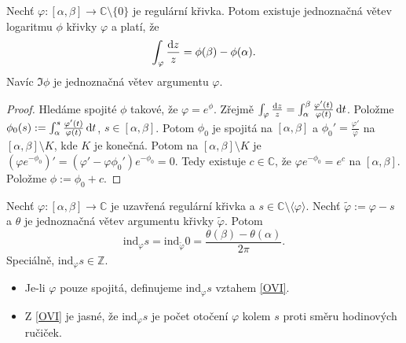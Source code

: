 \begin{theorem}
Nechť $\varphi: [\alpha, \beta] \rightarrow \mathbb{C} \setminus \{0\}$ je regulární křivka. Potom existuje jednoznačná větev logaritmu $\phi$ křivky $\varphi$ a platí, že
$$
\int_\varphi \frac{\mathop{}\!\mathrm{d} z}{z}=\phi(\beta) - \phi(\alpha) \text{.}
$$
Navíc $\Im \phi$ je jednoznačná větev argumentu $\varphi$.
\end{theorem}
\begin{proof}
Hledáme spojité $\phi$ takové, že $\varphi=e^\phi$. Zřejmě $\int_\varphi \frac{\mathop{}\!\mathrm{d} z}{z}=\int_\alpha^\beta \frac{\varphi'(t)}{\varphi(t)} \mathop{}\!\mathrm{d} t$. Položme $\phi_0(s):=\int_\alpha^s \frac{\varphi'(t)}{\varphi(t)} \mathop{}\!\mathrm{d} t$, $s \in [\alpha, \beta]$. Potom $\phi_0$ je spojitá na $[\alpha, \beta]$ a $\phi_0'=\frac{\varphi'}{\varphi}$ na $[\alpha, \beta] \setminus K$, kde $K$ je konečná. Potom na $[\alpha, \beta] \setminus K$ je $(\varphi e^{-\phi_0})'=(\varphi' - \varphi \phi_0') e^{-\phi_0}=0$. Tedy existuje $c \in \mathbb{C}$, že $\varphi e^{-\phi_0}=e^c$ na $[\alpha, \beta]$. Položme $\phi:=\phi_0+c$.
\end{proof}

\begin{theorem}
Nechť $\varphi: [\alpha, \beta] \rightarrow \mathbb{C}$ je uzavřená regulární křivka a $s \in \mathbb{C}\setminus \langle \varphi \rangle$. Nechť $\widetilde{\varphi}:=\varphi-s$ a $\theta$ je jednoznačná větev argumentu křivky $\widetilde{\varphi}$. Potom
\begin{equation}\tag{oVI}\label{OVI}
    \text{ind}_\varphi s= \text{ind}_{\widetilde{\varphi}}0=\frac{\theta(\beta)-\theta(\alpha)}{2 \pi}\text{.}
\end{equation}
Speciálně, $\text{ind}_\varphi s \in \mathbb{Z}$.
\end{theorem}

\begin{note*}
\begin{itemize}
    \item Je-li $\varphi$ pouze spojitá, definujeme $\text{ind}_\varphi s$ vztahem \cref{OVI}.
    \item Z \cref{OVI} je jasné, že $\text{ind}_\varphi s$ je počet otočení $\varphi$ kolem $s$ proti směru hodinových ručiček.
\end{itemize}
\end{note*}

